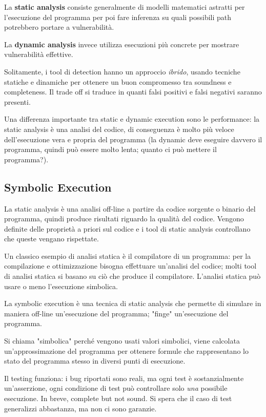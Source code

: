 La \textbf{static analysis} consiste generalmente di modelli matematici astratti per l'esecuzione del programma per poi fare inferenza su quali possibili path potrebbero portare a vulnerabilità. 

La \textbf{dynamic analysis} invece utilizza esecuzioni più concrete per mostrare vulnerabilità effettive. 

Solitamente, i tool di detection hanno un approccio \textit{ibrido}, usando tecniche statiche e dinamiche per ottenere un buon compromesso tra soundness e completeness. Il trade off si traduce in quanti falsi positivi e falsi negativi saranno presenti.

Una differenza importante tra static e dynamic execution sono le performance: la static analysis è una analisi del codice, di conseguenza è molto più veloce dell'esecuzione vera e propria del programma (la dynamic deve eseguire davvero il programma, quindi può essere molto lenta; quanto ci può mettere il programma?).

\subsection{Symbolic Execution}

La static analysis è una analisi off-line a partire da codice sorgente o binario del programma, quindi produce risultati riguardo la qualità del codice. Vengono definite delle proprietà a priori sul codice e i tool di static analysis controllano che queste vengano rispettate. 

Un classico esempio di analisi statica è il compilatore di un programma: per la compilazione e ottimizzazione bisogna effettuare un'analisi del codice; molti tool di analisi statica si basano su ciò che produce il compilatore. L'analisi statica può usare o meno l'esecuzione simbolica.

La symbolic execution è una tecnica di static analysis che permette di simulare in maniera off-line un'esecuzione del programma; "finge" un'esecuzione del programma. 

Si chiama "simbolica" perché vengono usati valori simbolici, viene calcolata un'approssimazione del programma per ottenere formule che rappresentano lo stato del programma stesso in diversi punti di esecuzione. 

Il testing funziona: i bug riportati sono reali, ma ogni test è sostanzialmente un'asserzione, ogni condizione di test può controllare solo \textit{una} possibile esecuzione. In breve, complete but not sound. Si spera che il caso di test generalizzi abbastanza, ma non ci sono garanzie.

